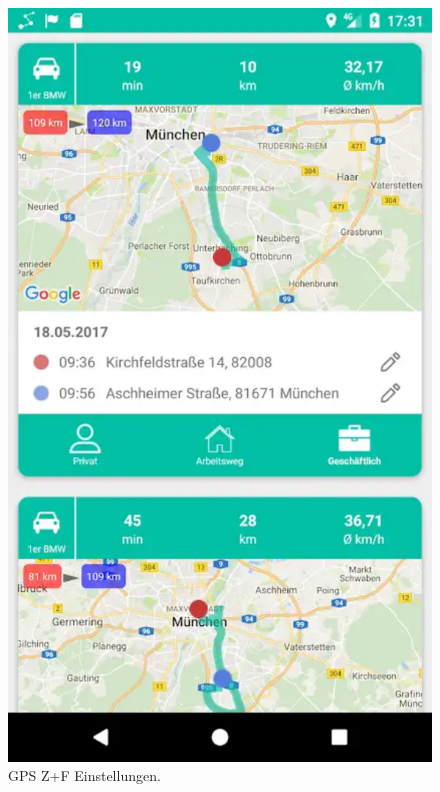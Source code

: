 \begin{figure}[H]%
    \begin{minipage}[b]{.4\linewidth} %
        \includegraphics[scale=0.14]{img/squ3}
        \caption{\label{img:img/squ3}GPS Z+F Einstellungen.}
    \end{minipage}
    \hspace{0.1\linewidth}%
    \begin{minipage}[b]{.4\linewidth} %

\end{minipage}
\end{figure}
